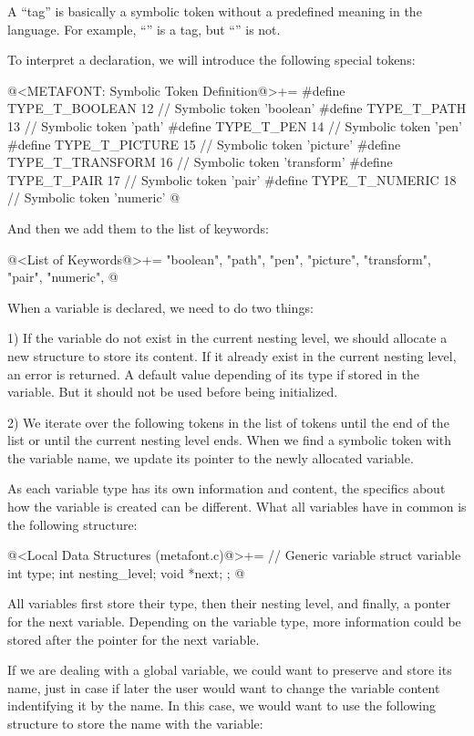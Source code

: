 A ``tag'' is basically a symbolic token without a predefined meaning
in the language. For example, ``'' is a tag, but
``'' is not.

To interpret a declaration, we will introduce the following special
tokens:

\iniciocodigo
@<METAFONT: Symbolic Token Definition@>+=
#define TYPE_T_BOOLEAN               12 // Symbolic token 'boolean'
#define TYPE_T_PATH                  13 // Symbolic token 'path'
#define TYPE_T_PEN                   14 // Symbolic token 'pen'
#define TYPE_T_PICTURE               15 // Symbolic token 'picture'
#define TYPE_T_TRANSFORM             16 // Symbolic token 'transform'
#define TYPE_T_PAIR                  17 // Symbolic token 'pair'
#define TYPE_T_NUMERIC               18 // Symbolic token 'numeric'
@
\fimcodigo

And then we add them to the list of keywords:

\iniciocodigo
@<List of Keywords@>+=
"boolean", "path", "pen", "picture", "transform", "pair", "numeric",
@
\fimcodigo


When a variable is declared, we need to do two things:

1) If the variable do not exist in the current nesting level, we
should allocate a new structure to store its content. If it already
exist in the current nesting level, an error is returned. A default
value depending of its type if stored in the variable. But it should
not be used before being initialized.

2) We iterate over the following tokens in the list of tokens until
the end of the list or until the current nesting level ends. When we
find a symbolic token with the variable name, we update its pointer to
the newly allocated variable.


As each variable type has its own information and content, the
specifics about how the variable is created can be different. What all
variables have in common is the following structure:

\iniciocodigo
@<Local Data Structures (metafont.c)@>+=
// Generic variable
struct variable{
  int type;
  int nesting_level;
  void *next;
};
@
\fimcodigo

All variables first store their type, then their nesting level, and
finally, a ponter for the next variable. Depending on the variable
type, more information could be stored after the pointer for the next
variable.

If we are dealing with a global variable, we could want to preserve
and store its name, just in case if later the user would want to
change the variable content indentifying it by the name. In this case,
we would want to use the following structure to store the name with
the variable:

